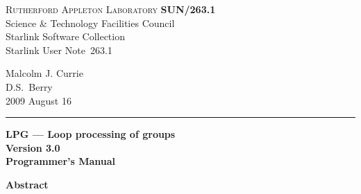 \documentclass[twoside,11pt]{article}
\newcommand{\stardoccategory}  {Starlink User Note}
\newcommand{\stardocinitials}  {SUN}
\newcommand{\stardocnumber}    {263.1}
\newcommand{\stardocauthors}   {Malcolm J. Currie\\D.S.\ Berry}
\newcommand{\stardocdate}      {2009 August 16}
\newcommand{\stardoctitle}     {LPG --- Loop processing of groups}
\newcommand{\stardocversion}   {Version 3.0}
\newcommand{\stardocmanual}    {Programmer's Manual}
\newcommand{\stardocname}{\stardocinitials /\stardocnumber}
\newenvironment{latexonly}{}{}
\renewcommand{\_}{\texttt{\symbol{95}}}
\begin{document}
\thispagestyle{empty}

\begin{latexonly}
   \textsc{Rutherford Appleton Laboratory} \hfill \textbf{\stardocname}\\
   {\large Science \& Technology Facilities Council}\\
   {\large Starlink Software Collection\\}
   {\large \stardoccategory\ \stardocnumber}
   \begin{flushright}
   \stardocauthors\\
   \stardocdate
   \end{flushright}
   \vspace{-4mm}
   \rule{\textwidth}{0.5mm}
   \vspace{5mm}
   \begin{center}
   {\Huge\textbf{\stardoctitle \\ [2.5ex]}}
   {\LARGE\textbf{\stardocversion \\ [4ex]}}
   {\Huge\textbf{\stardocmanual}}
   \end{center}
   \vspace{5mm}


   \vspace{10mm}
   \begin{center}
      {\Large\textbf{Abstract}}
   \end{center}
\end{latexonly}
\end{document}
